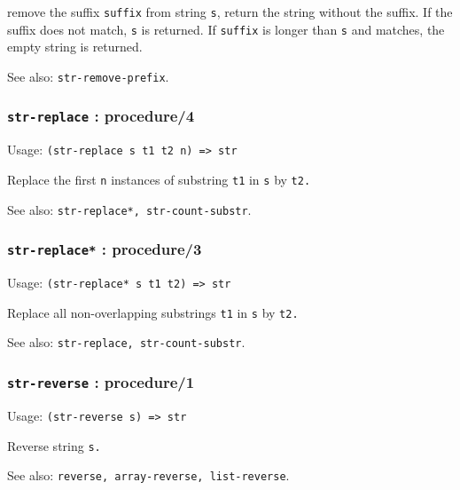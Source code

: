 \documentclass[
]{article}
\newcommand{\passthrough}[1]{#1}
\begin{document}
remove the suffix \passthrough{\lstinline!suffix!} from string
\passthrough{\lstinline!s!}, return the string without the suffix. If
the suffix does not match, \passthrough{\lstinline!s!} is returned. If
\passthrough{\lstinline!suffix!} is longer than
\passthrough{\lstinline!s!} and matches, the empty string is returned.

See also: \passthrough{\lstinline!str-remove-prefix!}.

\hypertarget{str-replace-procedure4}{%
\subsubsection{\texorpdfstring{\texttt{str-replace} :
procedure/4}{str-replace : procedure/4}}\label{str-replace-procedure4}}

Usage: \passthrough{\lstinline!(str-replace s t1 t2 n) => str!}

Replace the first \passthrough{\lstinline!n!} instances of substring
\passthrough{\lstinline!t1!} in \passthrough{\lstinline!s!} by
\passthrough{\lstinline!t2.!}

See also: \passthrough{\lstinline!str-replace*, str-count-substr!}.

\hypertarget{str-replace-procedure3}{%
\subsubsection{\texorpdfstring{\texttt{str-replace*} :
procedure/3}{str-replace* : procedure/3}}\label{str-replace-procedure3}}

Usage: \passthrough{\lstinline!(str-replace* s t1 t2) => str!}

Replace all non-overlapping substrings \passthrough{\lstinline!t1!} in
\passthrough{\lstinline!s!} by \passthrough{\lstinline!t2.!}

See also: \passthrough{\lstinline!str-replace, str-count-substr!}.

\hypertarget{str-reverse-procedure1}{%
\subsubsection{\texorpdfstring{\texttt{str-reverse} :
procedure/1}{str-reverse : procedure/1}}\label{str-reverse-procedure1}}

Usage: \passthrough{\lstinline!(str-reverse s) => str!}

Reverse string \passthrough{\lstinline!s.!}

See also:
\passthrough{\lstinline!reverse, array-reverse, list-reverse!}.
\end{document}
